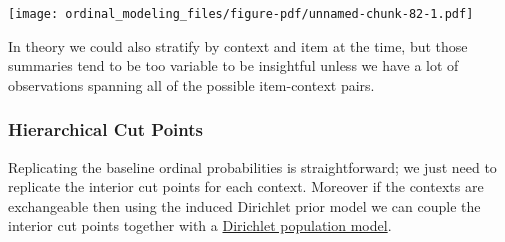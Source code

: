 \documentclass[
  letterpaper,
  DIV=11,
  numbers=noendperiod]{scrartcl}
\begin{document}
\texttt{[image: ordinal\_modeling\_files/figure-pdf/unnamed-chunk-82-1.pdf]}

In theory we could also stratify by context and item at the time, but
those summaries tend to be too variable to be insightful unless we have
a lot of observations spanning all of the possible item-context pairs.

\subsubsection{Hierarchical Cut Points}\label{hierarchical-cut-points}

Replicating the baseline ordinal probabilities is straightforward; we
just need to replicate the interior cut points for each context.
Moreover if the contexts are exchangeable then using the induced
Dirichlet prior model we can couple the interior cut points together
with a
\href{https://betanalpha.github.io/assets/chapters_html/die_fairness.html\#hierarchical-simplices}{Dirichlet
population model}.
\end{document}

